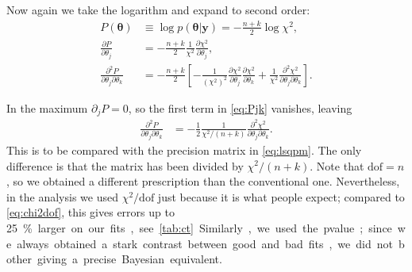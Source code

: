 Now again we take the logarithm and expand to second order:
%
\begin{align}
    P(\boldsymbol\theta) &\equiv
    \log p(\boldsymbol\theta|\mathbf y)
    = -\frac{n+k}2 \log \chi^2, \\
    \frac {\partial P} {\partial \theta_j}
    &= -\frac{n+k}2 \frac 1{\chi^2}
    \frac {\partial \chi^2} {\partial \theta_j}, \\
    \frac {\partial^2 P} {\partial\theta_j \partial\theta_k}
    &= -\frac{n+k}2 \left[
    -\frac 1 {(\chi^2)^2}
    \frac {\partial \chi^2} {\partial \theta_j}
    \frac {\partial \chi^2} {\partial \theta_k}
    + \frac 1{\chi^2}
    \frac {\partial^2 \chi^2} {\partial\theta_j \partial\theta_k}
    \right]. \label{eq:Pjk}
\end{align}

In the maximum $\partial_j P = 0$, so the first term in \eqref{eq:Pjk}
vanishes, leaving
%
\begin{align}
    \frac {\partial^2 P} {\partial\theta_j \partial\theta_k}
    &= -\frac12 \frac 1 {\chi^2/(n+k)}
    \frac {\partial^2 \chi^2} {\partial\theta_j \partial\theta_k}.
    \label{eq:chi2dof}
\end{align}
%
This is to be compared with the precision matrix in \eqref{eq:lsqpm}. The
only difference is that the matrix has been divided by $\chi^2/(n+k)$. Note
that $\mathrm{dof} = n$, so we obtained a different prescription than the
conventional one. Nevertheless, in the analysis we used $\chi^2/\mathrm{dof}$
just because it is what people expect; compared to \eqref{eq:chi2dof}, this
gives errors up to \SI{25}\% larger on our fits, see \autoref{tab:ct}.

Similarly, we used the pvalue; since we always obtained a stark contrast
between good and bad fits, we did not bother giving a precise Bayesian
equivalent.
